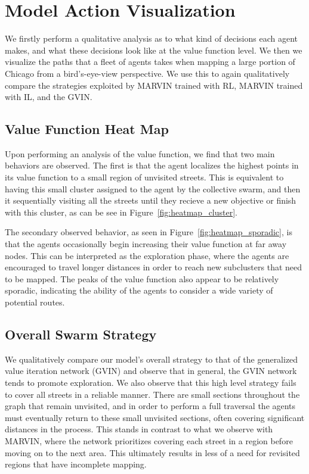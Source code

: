 
\clearpage
\appendix




\section{Model Action Visualization}

We firstly perform a qualitative analysis as to what kind of decisions each agent makes, and what
these decisions look like at the value function level. We then we visualize the paths that a fleet of
agents takes when mapping a large portion of Chicago from a bird's-eye-view perspective. We use this to
again qualitatively compare the strategies exploited by MARVIN trained with RL, MARVIN trained with IL,
and the GVIN.

\subsection{Value Function Heat Map}

Upon performing an analysis of the value function, we find that two main behaviors are observed. The
first is that the agent localizes the highest points in its value function to a small region of
unvisited streets. This is equivalent to having this small cluster assigned to the agent
by the collective swarm, and then it sequentially visiting all the streets until they recieve a new
objective or finish with this cluster, as can be see in Figure~\ref{fig:heatmap_cluster}.


The secondary observed behavior, as seen in Figure~\ref{fig:heatmap_sporadic}, is that the agents
occasionally begin increasing their value function at far away nodes. This can be interpreted
as the exploration phase, where the agents are encouraged to travel longer
distances in order to reach new subclusters that need to be
mapped. The peaks of the value function also appear to be relatively sporadic, indicating the
ability of the agents to consider a wide variety of potential routes.


\subsection{Overall Swarm Strategy}

We qualitatively compare our model's overall strategy to that of the generalized value iteration
network (GVIN) and observe that in general, the GVIN network tends to promote exploration.
We also observe that this high level strategy fails to cover all streets in a reliable
manner. There are small sections throughout the graph that remain unvisited, and
in order to perform a full traversal the agents must eventually
return to these small unvisited sections, often covering significant distances in
the process. This stands in contrast to what we observe with MARVIN, where the network prioritizes
covering each street in a region before moving on to the next area. This ultimately results in less
of a need for revisited regions that have incomplete mapping.

